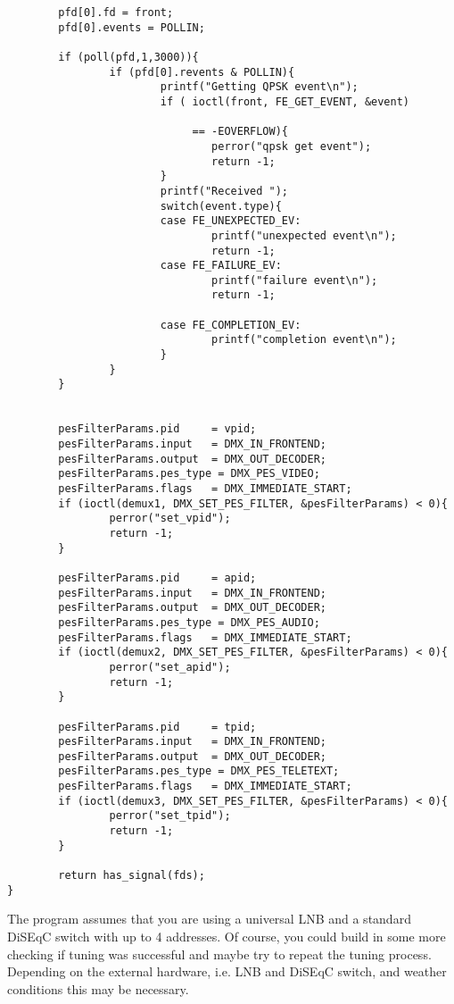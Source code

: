 {\begin{verbatim}
        pfd[0].fd = front;
        pfd[0].events = POLLIN;

        if (poll(pfd,1,3000)){
                if (pfd[0].revents & POLLIN){
                        printf("Getting QPSK event\n");
                        if ( ioctl(front, FE_GET_EVENT, &event)  

                             == -EOVERFLOW){
                                perror("qpsk get event");
                                return -1;
                        }
                        printf("Received ");
                        switch(event.type){
                        case FE_UNEXPECTED_EV:
                                printf("unexpected event\n");
                                return -1;
                        case FE_FAILURE_EV:
                                printf("failure event\n");
                                return -1;
                                
                        case FE_COMPLETION_EV:
                                printf("completion event\n");
                        }
                }
        }
      

        pesFilterParams.pid     = vpid;
        pesFilterParams.input   = DMX_IN_FRONTEND; 
        pesFilterParams.output  = DMX_OUT_DECODER; 
        pesFilterParams.pes_type = DMX_PES_VIDEO; 
        pesFilterParams.flags   = DMX_IMMEDIATE_START;
        if (ioctl(demux1, DMX_SET_PES_FILTER, &pesFilterParams) < 0){
                perror("set_vpid");
                return -1;
        }

        pesFilterParams.pid     = apid;
        pesFilterParams.input   = DMX_IN_FRONTEND; 
        pesFilterParams.output  = DMX_OUT_DECODER; 
        pesFilterParams.pes_type = DMX_PES_AUDIO; 
        pesFilterParams.flags   = DMX_IMMEDIATE_START;
        if (ioctl(demux2, DMX_SET_PES_FILTER, &pesFilterParams) < 0){
                perror("set_apid");
                return -1;
        }

        pesFilterParams.pid     = tpid;
        pesFilterParams.input   = DMX_IN_FRONTEND; 
        pesFilterParams.output  = DMX_OUT_DECODER; 
        pesFilterParams.pes_type = DMX_PES_TELETEXT; 
        pesFilterParams.flags   = DMX_IMMEDIATE_START;
        if (ioctl(demux3, DMX_SET_PES_FILTER, &pesFilterParams) < 0){
                perror("set_tpid");
                return -1;
        }

        return has_signal(fds);
}

\end{verbatim}
}
The program assumes that you are using a universal LNB and a standard
DiSEqC switch with up to 4 addresses. Of course, you could build in
some more checking if tuning was successful and maybe try to repeat
the tuning process. Depending on the external hardware, i.e. LNB and
DiSEqC switch, and weather conditions this may be necessary. 


